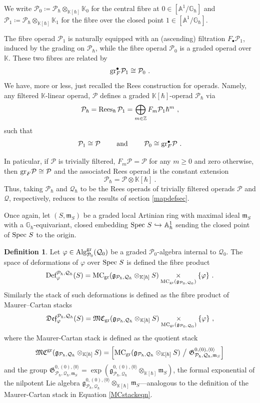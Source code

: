 \documentclass[11pt]{amsart}
\numberwithin{equation}{section}
\theoremstyle{definition}
\newtheorem{defn}[theo]{Definition}
\newcommand{\bb}{\mathbb}
\newcommand{\mc}{\mathcal}
\newcommand{\mf}{\mathfrak}
\newcommand{\Rees}{{\textup{Rees}}}
\newcommand{\Def}{{\textup{Def}}}
\newcommand{\fDef}{{\mathfrak{Def}}}
\newcommand{\Ph}{{\mathcal{P}_\hbar}}
\newcommand{\Qh}{{\mathcal{Q}_\hbar}}
\newcommand{\gPQh}{{\mathfrak{g}_{\mc P_\hbar,\mc Q_\hbar}}}
\newcommand{\K}{{\bb K}}
\newcommand{\ik}{{\bb K}}
\newcommand{\into}{{\ \hookrightarrow\ }}
\newcommand{\Spec}{{\textup{Spec\ }}}
\newcommand{\Alg}{{\textup{Alg}}}
\newcommand{\MC}{{{\textup{MC}}}}
\newcommand{\fMC}{{{\mathfrak{MC}}}}
\newcommand{\0}{{\textbf{0}}}
\newcommand{\gr}{\textup{gr}}
\newcommand{\g}{{\mf{g}}}
\def\IA{\mathbb{A}}
\def\IZ{\mathbb{Z}}
\def\IG{\mathbb{G}}
\def\PP{{\mc P}}
\def\QQ{{\mc Q}}
\def\gf{\mathfrak{g}}
\def \mf{\mathfrak}
\newcommand{\fibre}[1]{\underset{#1}{\times}}
\begin{document}
We write $\PP_0\coloneqq \PP_\hbar \otimes_{\ik[\hbar]}\ik_0$ for the central fibre at $0\in [\IA^1/\IG_\hbar]$ and $\PP_1\coloneqq \PP_\hbar\otimes_{\ik[\hbar]}\ik_1$ for the fibre over the closed point $1\in [\IA^1/\IG_\hbar]$.

The fibre operad $\PP_1$ is naturally equipped with an (ascending) filtration $F_\bullet \PP_1$, induced by the grading on $\PP_\hbar$, while the fibre operad $\PP_0$ is a graded operad over $\ik$. These two fibres are related by
\[
\gr^\bullet_{F}\PP_1 \cong \PP_0~.
\]
We have, more or less, just recalled the Rees construction for operads. Namely, any filtered $\ik$-linear operad, $\PP$ defines a graded $\ik[\hbar]$-operad $\PP_\hbar$ via
\[
\PP_\hbar = \Rees_\hbar\, \PP_1 = \bigoplus_{m\in\IZ} F_m \PP_1\hbar^m~,
\]
such that 
\[
\PP_1 \cong \PP \qquad \text{ and } \qquad \PP_0 \cong \gr^\bullet_F \PP~.
\]

In paticular, if $\PP$ is trivially filtered, $F_m \PP = \PP$ for any $m\ge 0$ and zero otherwise, then $\gr_F \PP \cong \PP$ and the associated Rees operad is the constant extension
\[
\PP_\hbar = \PP\otimes \ik[\hbar]~.
\]
Thus, taking $\PP_\hbar$ and $\QQ_\hbar$ to be the Rees operads of trivially filtered operads $\PP$ and $\QQ$, respectively, reduces to the results of section \ref{mapdefsec}.

Once again, let $(S,\mf m_S)$ be a graded local Artinian ring with maximal ideal $\mf m_S$ with a $\IG_\hbar$-equivariant, closed embedding $\Spec S \into \IA^1_\hbar$ sending the closed point of $\Spec S$ to the origin.

\begin{defn}\label{Defhbargrdefn} 
Let $\varphi\in \Alg^\gr_{\mc P_0}(\mc Q_0)$ be a graded $\mc P_0$-algebra internal to $\mc Q_0$. The space of deformations of $\varphi$ over $\Spec S$ is defined the fibre product
\[
\Def_\varphi^{\Ph,\Qh}(S) = \MC_\gr(\gPQh\otimes_{\ik[\hbar]} S) \fibre{\MC_\gr(\gf_{\PP_0,\QQ_0})}\{\varphi\}~.
\]
Similarly the stack of such deformations is defined as the fibre product of Maurer--Cartan stacks
\[
\fDef_\varphi^{\Ph,\Qh}(S) = \fMC_\gr(\gPQh\otimes_{\ik[\hbar]} S) \fibre{\MC_\gr(\gf_{\PP_0,\QQ_0})}\{\varphi\}~,
\]
where the Maurer-Cartan stack is defined as the quotient stack
\[ 
\fMC^\gr(\g_{\Ph,\Qh }\otimes_{\K[\hbar]} S)= \left[ \MC_\gr(\g_{\Ph,\Qh }\otimes_{\K[\hbar]} S)\  \big/\  \mf G^{0,(0),\langle 0\rangle}_{\Ph,\Qh,\mf m_S} \right]  
\]
and the group $\mf G^{0,(0),\langle 0 \rangle}_{\Ph,\Qh,\mf m_S}=\exp(\g^{0,(0),\langle 0\rangle}_{\Ph,\Qh}\otimes_{\K[\hbar]} \mf m_S)$, the formal exponential of the nilpotent Lie algebra $\g^{0,(0),\langle 0 \rangle}_{\Ph,\Qh}\otimes_{\K[\hbar]} \mf m_S$---analogous to the definition of the Maurer-Cartan stack in Equation \ref{MCstackeqn}.
\end{defn}
\end{document}
